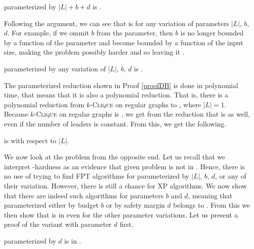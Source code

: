 \begin{remark}\label{cor:LnBD:Wh}
    \HL parameterized by $|L|+b+d$ is \Wh.
\end{remark}

Following the argument, we can see that \HL is \Wh for any variation of parameters $|L|$, $b$, $d$.
For example, if we ommit $b$ from the parameter, then $b$ is no longer bounded by a function of the parameter and
become bounded by a function of the input size, making the problem possibly harder and so leaving it \Wh.

\begin{corollary}\label{cor:LnBD:variation:Wh}
    \HL parameterized by any variation of $|L|$, $b$, $d$ is \Wh.
\end{corollary}

The parameterized reduction shown in Proof \ref{proofDB} is done in polynomial time,
that means that it is also a polynomial reduction.
That is, there is a polynomial reduction from $k$-\textsc{Clique} on regular graphs to \HL, where $|L| = 1$.
Because $k$-\textsc{Clique} on regular graphs is \NPh, we get from the reduction that \HL is \NPh as well,
even if the number of leaders is constant.
From this, we get the following.

\begin{corollary}\label{cor:Ln:pNPh}
    \HL is \pNPh with respect to $|L|$.
\end{corollary}


We now look at the problem from the opposite end.
Let us recall that we interpret \W-hardness as an evidence that given problem is not in \FPT.
Hence, there is no use of trying to find FPT algorithms for \HL parameterized by $|L|$, $b$, $d$, or any of their variation.
However, there is still a chance for XP algorithms.
We now show that there are indeed such algorithms for parameters $b$ and $d$, meaning that
\HL parameterized either by budget $b$ or by safety margin $d$ belongs to \XP.
From this we then show that \HLshort is in \XP even for the other parameter variations.
Let us present a proof of the variant with parameter $d$ first.

\begin{theorem}\label{theorem:D:XP}
    \HL parameterized by $d$ is in \XP.
\end{theorem}

